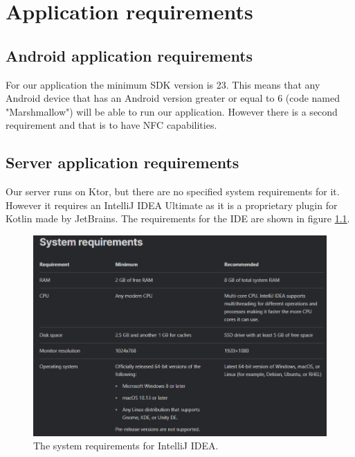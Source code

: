 \chapter{Application requirements}
\label{chap:ch4}

\section{Android application requirements}
\label{sec:ch4sec1}

\par For our application the minimum SDK version is 23. This means that any Android device that has an Android version greater or equal to 6 (code named "Marshmallow") will be able to run our application. However there is a second requirement and that is to have NFC capabilities.

\section{Server application requirements}
\label{sec:ch4sec2}

\par Our server runs on Ktor, but there are no specified system requirements for it. However it requires an IntelliJ IDEA Ultimate as it is a proprietary plugin for Kotlin made by JetBrains. The requirements for the IDE are shown in figure \ref{fig:requirements-intelij}.

\begin{figure}
\centering
\includegraphics[width=\textwidth]{figures/system_requirements_intellij.png}
\caption{The system requirements for IntelliJ IDEA. \cite{intellijIdea}}
\label{fig:requirements-intelij}
\end{figure}

